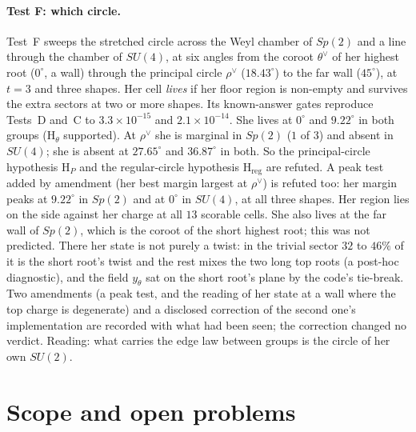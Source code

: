 \documentclass[11pt]{article}
\theoremstyle{definition}
\theoremstyle{remark}
\begin{document}
\paragraph{Test F: which circle.} Test~F sweeps the stretched circle across the Weyl chamber of $Sp(2)$ and a line
through the chamber of $SU(4)$, at six angles from the coroot $\theta^\vee$ of her highest root ($0^\circ$, a wall)
through the principal circle $\rho^\vee$ ($18.43^\circ$) to the far wall ($45^\circ$), at $t=3$ and three shapes. Her
cell \emph{lives} if her floor region is non-empty and survives the extra sectors at two or more shapes. Its
known-answer gates reproduce Tests~D and~C to $3.3\times10^{-15}$ and $2.1\times10^{-14}$. She lives at $0^\circ$ and
$9.22^\circ$ in both groups (H$_\theta$ supported). At $\rho^\vee$ she is marginal in $Sp(2)$ ($1$ of $3$) and absent
in $SU(4)$; she is absent at $27.65^\circ$ and $36.87^\circ$ in both. So the principal-circle hypothesis H$_P$ and the
regular-circle hypothesis H$_{\mathrm{reg}}$ are refuted. A peak test added by amendment (her best margin largest at
$\rho^\vee$) is refuted too: her margin peaks at $9.22^\circ$ in $Sp(2)$ and at $0^\circ$ in $SU(4)$, at all three
shapes. Her region lies on the side against her charge at all $13$ scorable cells. She also lives at the far wall of
$Sp(2)$, which is the coroot of the short highest root; this was not predicted. There her state is not purely a twist: in the trivial sector
$32$ to $46\%$ of it is the short root's twist and the rest mixes the two long top roots (a post-hoc diagnostic), and
the field $y_\theta$ sat on the short root's plane by the code's tie-break. Two amendments (a peak test, and the
reading of her state at a wall where the top charge is degenerate) and a disclosed correction of the second one's
implementation are recorded with what had been seen; the correction changed no verdict. Reading: what carries the edge
law between groups is the circle of her own $SU(2)$.

\section{Scope and open problems}\label{sec:scope}
\end{document}
